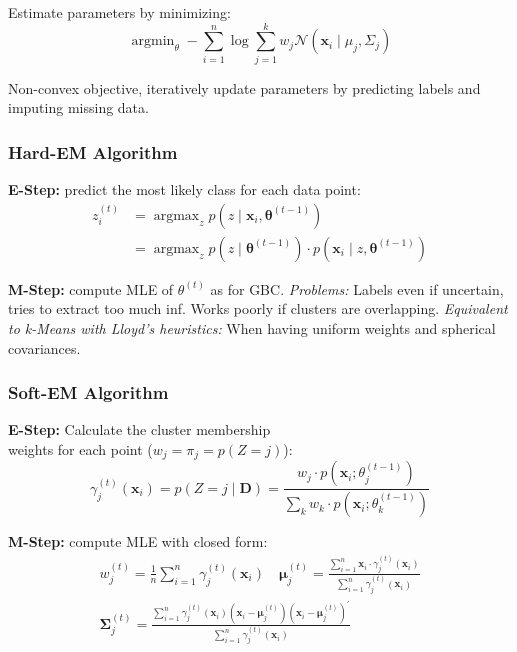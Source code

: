 \documentclass[a4paper,11pt]{article}
\begin{document}
Estimate parameters by minimizing:
$$
\textstyle \operatorname{argmin}_\theta -\sum_{i=1}^n \log \sum_{j=1}^k w_j \mathcal{N}(\mathbf{x}_i \mid \mu_j, \Sigma_j)
$$

Non-convex objective, iteratively update parameters by predicting labels and imputing missing data.


\subsubsection*{Hard-EM Algorithm}

\textbf{E-Step:} predict the most likely class for each data point:
$$
\begin{aligned}
z_i^{(t)} & \textstyle =\operatorname{argmax}_z p(z \mid \mathbf{x}_i, \boldsymbol{\theta}^{(t-1)}) \\
& =\operatorname{argmax}_z p(z \mid \boldsymbol{\theta}^{(t-1)}) \cdot p(\mathbf{x}_i \mid z, \boldsymbol{\theta}^{(t-1)})
\end{aligned}
$$

\textbf{M-Step:} compute MLE of $\theta^{(t)}$ as for GBC.
\textit{Problems:} Labels even if uncertain, tries to extract too much inf. Works poorly if clusters are overlapping. \textit{Equivalent to k-Means with Lloyd's heuristics:} When having uniform weights and spherical covariances.


\subsubsection*{Soft-EM Algorithm}

\textbf{E-Step:} Calculate the cluster membership \\ weights for each point ($w_j\!=\!\pi_j\!=\!p(Z\!=\!j)$):
$$
\textstyle \gamma_j^{(t)}\left(\mathbf{x}_i\right)=p(Z=j \mid \mathbf{D})=\frac{w_j \cdot p\left(\mathbf{x}_i ; \theta_j^{(t-1)}\right)}{\sum_k w_k \cdot p\left(\mathbf{x}_i ; \theta_k^{(t-1)}\right)}
$$

\textbf{M-Step:} compute MLE with closed form:
$$
\begin{gathered}
w_j^{(t)}=\textstyle \frac{1}{n} \sum_{i=1}^n \gamma_j^{(t)}\left(\mathbf{x}_i\right) \quad \boldsymbol{\mu}_j^{(t)}=\frac{\sum_{i=1}^n \mathbf{x}_i \cdot \gamma_j^{(t)}\left(\mathbf{x}_i\right)}{\sum_{i=1}^n \gamma_j^{(t)}\left(\mathbf{x}_i\right)} \\
\textstyle \boldsymbol{\Sigma}_j^{(t)}=\frac{\sum_{i=1}^n \gamma_j^{(t)}\left(\mathbf{x}_i\right)\left(\mathbf{x}_i-\boldsymbol{\mu}_j^{(t)}\right)\left(\mathbf{x}_i-\boldsymbol{\mu}_j^{(t)}\right)^{\prime}}{\sum_{i=1}^n \gamma_j^{(t)}\left(\mathbf{x}_i\right)}
\end{gathered}
$$
\end{document}
